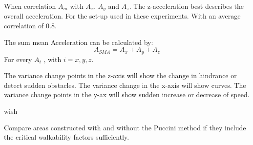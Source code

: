 When correlation $A_{m}$ with $A_{x}$, $A_{y}$ and $A_{z}$. The z-acceleration best describes the overall acceleration. For the set-up used in these experiments.  With an average correlation of 0.8.




The sum mean Acceleration can be calculated by:  %
\begin{equation}
A_{SMA} = A_{x} + A_{y} + A_{z}
\end{equation}
For every $A_{i}$ , with $i = {x, y, z}$.

The variance change points in the z-axis will show the change in hindrance or detect sudden obstacles. The variance change in the x-axis will show curves. 
The variance change points in the y-ax will show sudden increase or decrease of speed. 

wish 


\item Compare areas constructed with and without the Puccini method if they include the critical walkability factors sufficiently.